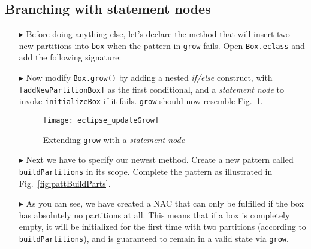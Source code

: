 \newpage
\hypertarget{conBran tex}{}
\subsection{Branching with statement nodes}
\texHeader

\begin{itemize}

\item[$\blacktriangleright$] Before doing anything else, let's declare the method that will insert two new partitions into \texttt{box} when the
pattern in \texttt{grow} fails. Open \texttt{Box.eclass} and add the following signature: 

\vspace{0.5cm}

\item[$\blacktriangleright$] Now modify \texttt{Box.grow()} by adding a nested \emph{if/else} construct, with \texttt{[addNewPartitionBox]} as the
first conditional, and a \emph{statement node} to invoke \texttt{initializeBox} if it fails. \texttt{grow} should now resemble Fig.~\ref{fig:updateGrow}.

\vspace{0.5cm}

\begin{figure}[htp]
\begin{center}
  \texttt{[image: eclipse\_updateGrow]}
  \caption{Extending \texttt{grow} with a \emph{statement node}}
  \label{fig:updateGrow}
\end{center}
\end{figure}

\vspace{0.5cm}

\item[$\blacktriangleright$] Next we have to specify our newest method. Create a new pattern called \texttt{buildPartitions} in its scope. Complete
the pattern as illustrated in Fig.~\ref{fig:pattBuildParts}.

\item[$\blacktriangleright$] As you can see, we have created a NAC that can only be fulfilled if the box has absolutely no partitions at all. This means that if
a box is completely empty, it will be initialized for the first time with two partitions (according to \texttt{buildPartitions}), and is guaranteed to remain in
a valid state via \texttt{grow}.

\clearpage


\end{itemize}
